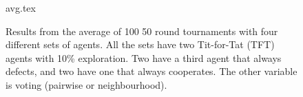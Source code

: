 \begin{figure} [ht]
\begin{center}
 {avg.tex} 
\end {center}
\caption{Results from the average of 100  50 round tournaments with four
  different sets of agents.  All the sets have two Tit-for-Tat (TFT) agents with
  10\%   exploration.  Two have a third agent that always defects, and
  two have one that always cooperates.  The other variable is
  voting (pairwise or neighbourhood).}
  \label{figStaticAverage}
\end {figure}
